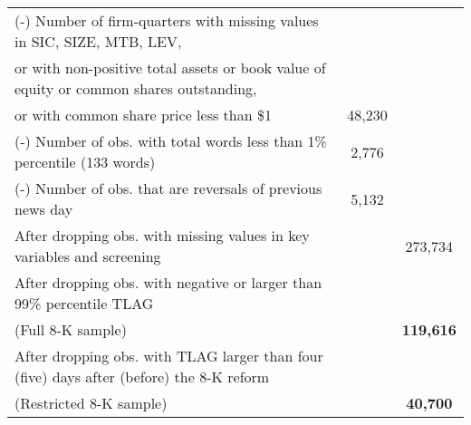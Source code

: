 \begin{table}[htbp]
\begin{tabular}{lcc}
    (-) Number of firm-quarters with missing values in SIC, SIZE, MTB, LEV, & & \\
    \hspace{5mm}or with non-positive total assets or book value of equity or common shares outstanding, & & \\
    \hspace{5mm}or with common share price less than \$1 & 48,230 & \\
    (-) Number of obs. with total words less than 1\% percentile (133 words) & 2,776 & \\
    (-) Number of obs. that are reversals of previous news day & 5,132 & \\
    \bottomrule
    After dropping obs. with missing values in key variables and screening  & & 273,734 \\
    After dropping obs. with negative or larger than 99\% percentile TLAG &  &  \\
    (Full 8-K sample)& & \textbf{119,616} \\
    After dropping obs. with TLAG larger than four (five) days after (before) the 8-K reform &  & \\
    (Restricted 8-K sample) &  & \textbf{40,700} 
    \end{tabular}%
\end{table}%
